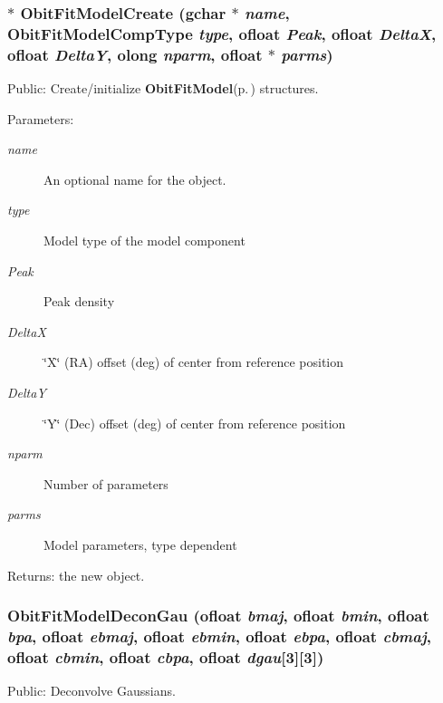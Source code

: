 \subsubsection{$\ast$ Obit\-Fit\-Model\-Create (gchar $\ast$ {\em name}, Obit\-Fit\-Model\-Comp\-Type {\em type}, {\bf ofloat} {\em Peak}, {\bf ofloat} {\em Delta\-X}, {\bf ofloat} {\em Delta\-Y}, {\bf olong} {\em nparm}, {\bf ofloat} $\ast$ {\em parms})}\label{ObitFitModel_8c_a11}


Public: Create/initialize {\bf Obit\-Fit\-Model}{\rm (p.\,\pageref{structObitFitModel})} structures. 

\begin{Desc}
\item[Parameters:]
\begin{description}
\item[{\em name}]An optional name for the object. \item[{\em type}]Model type of the model component \item[{\em Peak}]Peak density \item[{\em Delta\-X}]\char`\"{}X\char`\"{} (RA) offset (deg) of center from reference position \item[{\em Delta\-Y}]\char`\"{}Y\char`\"{} (Dec) offset (deg) of center from reference position \item[{\em nparm}]Number of parameters \item[{\em parms}]Model parameters, type dependent \end{description}
\end{Desc}
\begin{Desc}
\item[Returns:]the new object. \end{Desc}
\subsubsection{ Obit\-Fit\-Model\-Decon\-Gau ({\bf ofloat} {\em bmaj}, {\bf ofloat} {\em bmin}, {\bf ofloat} {\em bpa}, {\bf ofloat} {\em ebmaj}, {\bf ofloat} {\em ebmin}, {\bf ofloat} {\em ebpa}, {\bf ofloat} {\em cbmaj}, {\bf ofloat} {\em cbmin}, {\bf ofloat} {\em cbpa}, {\bf ofloat} {\em dgau}[3][3])}\label{ObitFitModel_8c_a12}


Public: Deconvolve Gaussians. 

